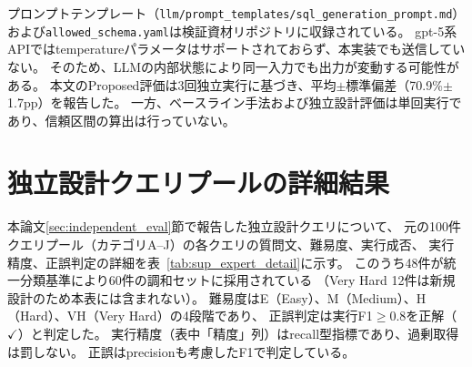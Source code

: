 \documentclass[5p,twocolumn]{elsarticle}
\begin{document}
プロンプトテンプレート（\texttt{llm/prompt\_templates/sql\_generation\_prompt.md}）
および\texttt{allowed\_schema.yaml}は検証資材リポジトリに収録されている。
gpt-5系APIではtemperatureパラメータはサポートされておらず、本実装でも送信していない。
そのため、LLMの内部状態により同一入力でも出力が変動する可能性がある。
本文のProposed評価は3回独立実行に基づき、平均$\pm$標準偏差（70.9\%$\pm$1.7pp）を報告した。
一方、ベースライン手法および独立設計評価は単回実行であり、信頼区間の算出は行っていない。

\section{独立設計クエリプールの詳細結果}
\label{sec:sup_expert_queries}

本論文\ref{sec:independent_eval}節で報告した独立設計クエリについて、
元の100件クエリプール（カテゴリA--J）の各クエリの質問文、難易度、実行成否、
実行精度、正誤判定の詳細を表~\ref{tab:sup_expert_detail}に示す。
このうち48件が統一分類基準により60件の調和セットに採用されている
（Very Hard 12件は新規設計のため本表には含まれない）。
難易度はE（Easy）、M（Medium）、H（Hard）、VH（Very Hard）の4段階であり、
正誤判定は実行F1$\geq 0.8$を正解（$\checkmark$）と判定した。
実行精度（表中「精度」列）はrecall型指標であり、過剰取得は罰しない。
正誤はprecisionも考慮したF1で判定している。
\end{document}

